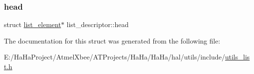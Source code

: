 \subsubsection{\texorpdfstring{head}{head}}
{\footnotesize\ttfamily struct \hyperlink{structlist__element}{list\+\_\+element}$\ast$ list\+\_\+descriptor\+::head}



The documentation for this struct was generated from the following file\+:\begin{DoxyCompactItemize}
\item 
E\+:/\+Ha\+Ha\+Project/\+Atmel\+Xbee/\+A\+T\+Projects/\+Ha\+Ha/\+Ha\+Ha/hal/utils/include/\hyperlink{utils__list_8h}{utils\+\_\+list.\+h}\end{DoxyCompactItemize}
